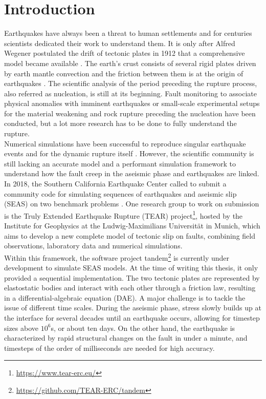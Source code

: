 \chapter{Introduction}
Earthquakes have always been a threat to human settlements and for centuries scientists dedicated their work to understand them. It is only after Alfred Wegener postulated the drift of tectonic plates in 1912 that a comprehensive model became available \cite{Wegener}. The earth's crust consists of several rigid plates driven by earth mantle convection and the friction between them is at the origin of earthquakes \cite{introductionGeophysics}. The scientific analysis of the period preceding the rupture process, also referred as nucleation, is still at its beginning. Fault monitoring to associate physical anomalies with imminent earthquakes \cite{AnomaliesNucleation,MagneticNucleation} or small-scale experimental setups for the material weakening and rock rupture preceding the nucleation \cite{ExperimentalNucleation} have been conducted, but a lot more research has to be done to fully understand the rupture. \\
Numerical simulations have been successful to reproduce singular earthquake events \cite{SeissolBigSimulation} and for the dynamic rupture itself \cite{DynamicRupture}. However, the scientific community is still lacking an accurate model and a performant simulation framework to understand how the fault creep in the aseismic phase and earthquakes are linked. In 2018, the Southern California Earthquake Center called to submit a community code for simulating sequences of earthquakes and aseismic slip (SEAS) on two benchmark problems \cite{BP1-Benchmark}. One research group to work on submission is the Truly Extended Earthquake Rupture (TEAR) project\footnote{\href{https://www.tear-erc.eu/}{https://www.tear-erc.eu/}}, hosted by the Institute for Geophysics at the Ludwig-Maximilians Universität in Munich, which aims to develop a new complete model of tectonic slip on faults, combining field observations, laboratory data and numerical simulations. \\
Within this framework, the software project {\ttfamily tandem}\footnote{\href{https://github.com/TEAR-ERC/tandem}{https://github.com/TEAR-ERC/tandem}} is currently under development to simulate SEAS models. At the time of writing this thesis, it only provided a sequential implementation. The two tectonic plates are represented by elastostatic bodies and interact with each other through a friction law, resulting in a differential-algebraic equation (DAE). A major challenge is to tackle the issue of different time scales. During the aseismic phase, stress slowly builds up at the interface for several decades until an earthquake occurs, allowing for timestep sizes above $10^6$s, or about ten days. On the other hand, the earthquake is characterized by rapid structural changes on the fault in under a minute, and timesteps of the order of milliseconds are needed for high accuracy. \\
